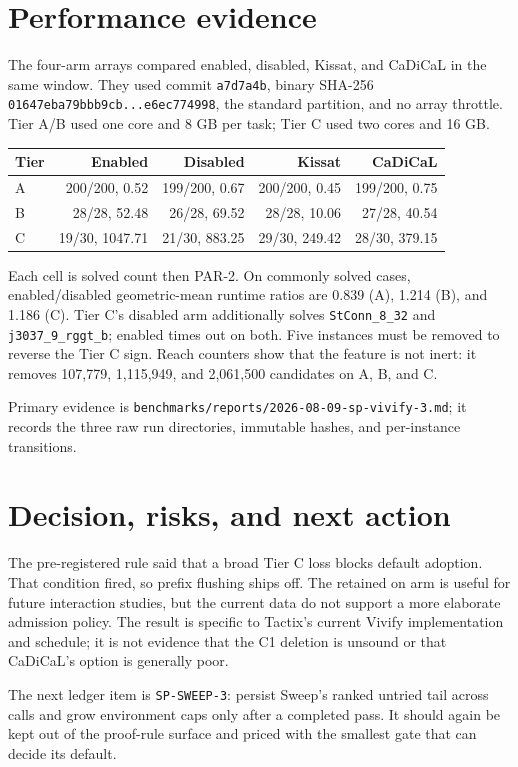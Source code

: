 \documentclass[11pt]{article}
\begin{document}
\section{Performance evidence}
The four-arm arrays compared enabled, disabled, Kissat, and CaDiCaL in the same
window.  They used commit \texttt{a7d7a4b}, binary SHA-256
\texttt{01647eba79bbb9cb...e6ec774998}, the standard partition, and no array
throttle.  Tier A/B used one core and 8 GB per task; Tier C used two cores and
16 GB.

\begin{center}
\begin{tabular}{lrrrr}
\toprule
Tier & Enabled & Disabled & Kissat & CaDiCaL \\
\midrule
A & 200/200, 0.52 & 199/200, 0.67 & 200/200, 0.45 & 199/200, 0.75 \\
B & 28/28, 52.48 & 26/28, 69.52 & 28/28, 10.06 & 27/28, 40.54 \\
C & 19/30, 1047.71 & 21/30, 883.25 & 29/30, 249.42 & 28/30, 379.15 \\
\bottomrule
\end{tabular}
\end{center}

Each cell is solved count then PAR-2.  On commonly solved cases, enabled/disabled
geometric-mean runtime ratios are 0.839 (A), 1.214 (B), and 1.186 (C).  Tier C's
disabled arm additionally solves \texttt{StConn\_8\_32} and
\texttt{j3037\_9\_rggt\_b}; enabled times out on both.  Five instances must be
removed to reverse the Tier C sign.  Reach counters show that the feature is not
inert: it removes 107,779, 1,115,949, and 2,061,500 candidates on A, B, and C.

Primary evidence is
\texttt{benchmarks/reports/2026-08-09-sp-vivify-3.md}; it records the three raw
run directories, immutable hashes, and per-instance transitions.

\section{Decision, risks, and next action}
The pre-registered rule said that a broad Tier C loss blocks default adoption.
That condition fired, so prefix flushing ships off.  The retained on arm is
useful for future interaction studies, but the current data do not support a
more elaborate admission policy.  The result is specific to Tactix's current
Vivify implementation and schedule; it is not evidence that the C1 deletion is
unsound or that CaDiCaL's option is generally poor.

The next ledger item is \texttt{SP-SWEEP-3}: persist Sweep's ranked untried tail
across calls and grow environment caps only after a completed pass.  It should
again be kept out of the proof-rule surface and priced with the smallest gate
that can decide its default.
\end{document}
